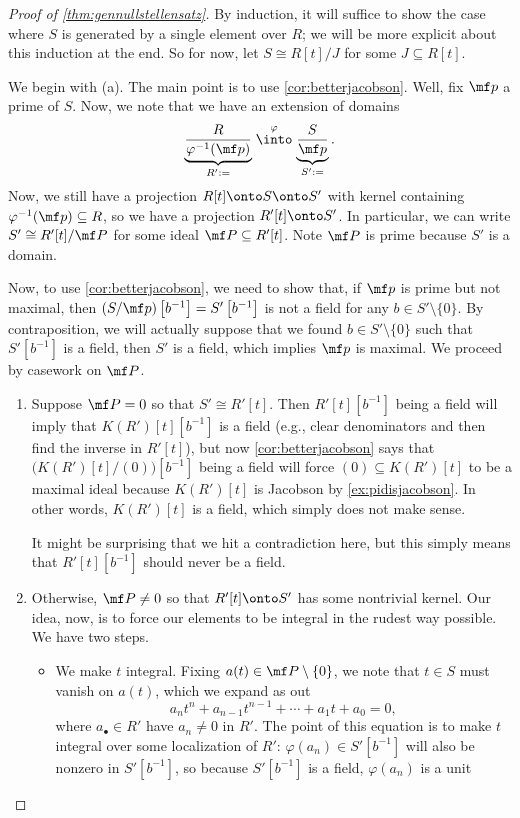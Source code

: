 \begin{proof}[Proof of \autoref{thm:gennullstellensatz}]
	By induction, it will suffice to show the case where $S$ is generated by a single element over $R$; we will be more explicit about this induction at the end.
	So for now, let $S\cong R[t]/J$ for some $J\subseteq R[t]$.

	We begin with (a). The main point is to use \autoref{cor:betterjacobson}. Well, fix $\mf p$ a prime of $S$. Now, we note that we have an extension of domains
	\[\underbrace{\frac R{\varphi^{-1}(\mf p)}}_{R':=}\stackrel\varphi\into\underbrace{\frac S{\mf p}}_{S':=}.\]
	Now, we still have a projection $R[t]\onto S\onto S'$ with kernel containing $\varphi^{-1}(\mf p)\subseteq R$, so we have a projection $R'[t]\onto S'$. In particular, we can write $S'\cong R'[t]/\mf P$ for some ideal $\mf P\subseteq R'[t]$. Note $\mf P$ is prime because $S'$ is a domain.
	
	Now, to use \autoref{cor:betterjacobson}, we need to show that, if $\mf p$ is prime but not maximal, then $(S/\mf p)\left[b^{-1}\right]=S'\left[b^{-1}\right]$ is not a field for any $b\in S'\setminus\{0\}$. By contraposition, we will actually suppose that we found $b\in S'\setminus\{0\}$ such that $S'\left[b^{-1}\right]$ is a field, then $S'$ is a field, which implies $\mf p$ is maximal. We proceed by casework on $\mf P$.
	\begin{enumerate}[label=(\roman*)]
		\item Suppose $\mf P=0$ so that $S'\cong R'[t]$. Then $R'[t]\left[b^{-1}\right]$ being a field will imply that $K(R')[t]\left[b^{-1}\right]$ is a field (e.g., clear denominators and then find the inverse in $R'[t]$), but now \autoref{cor:betterjacobson} says that $\big(K(R')[t]/(0)\big)\left[b^{-1}\right]$ being a field will force $(0)\subseteq K(R')[t]$ to be a maximal ideal because $K(R')[t]$ is Jacobson by \autoref{ex:pidisjacobson}. In other words, $K(R')[t]$ is a field, which simply does not make sense.

		It might be surprising that we hit a contradiction here, but this simply means that $R'[t]\left[b^{-1}\right]$ should never be a field.

		\item Otherwise, $\mf P\ne0$ so that $R'[t]\onto S'$ has some nontrivial kernel. Our idea, now, is to force our elements to be integral in the rudest way possible. We have two steps.
		\begin{itemize}
			\item We make $t$ integral. Fixing $a(t)\in\mf P\setminus\{0\}$, we note that $t\in S$ must vanish on $a(t)$, which we expand as out
			\[a_nt^n+a_{n-1}t^{n-1}+\cdots+a_1t+a_0=0,\]
			where $a_\bullet\in R'$ have $a_n\ne0$ in $R'$. The point of this equation is to make $t$ integral over some localization of $R'$: $\varphi(a_n)\in S'\left[b^{-1}\right]$ will also be nonzero in $S'\left[b^{-1}\right]$, so because $S'\left[b^{-1}\right]$ is a field, $\varphi(a_n)$ is a unit
			

\end{itemize}
\end{enumerate}
\end{proof}
